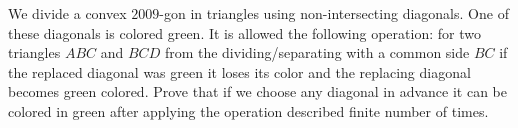 We divide a convex $2009$-gon in triangles using non-intersecting diagonals. One of these diagonals is colored green. It is allowed the following operation: for two triangles $ABC$ and $BCD$ from the dividing/separating with a common side $BC$ if the replaced diagonal was green it loses its color and the replacing diagonal becomes green colored. Prove that if we choose any diagonal in advance it can be colored in green after applying the operation described finite number of times.